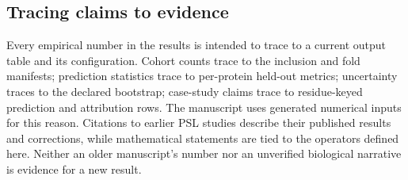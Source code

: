 \subsection{Tracing claims to evidence}
\label{sec:evidence_details}
Every empirical number in the results is intended to trace to a current output table and its configuration. Cohort counts trace to the inclusion and fold manifests; prediction statistics trace to per-protein held-out metrics; uncertainty traces to the declared bootstrap; case-study claims trace to residue-keyed prediction and attribution rows. The manuscript uses generated numerical inputs for this reason. Citations to earlier PSL studies describe their published results and corrections, while mathematical statements are tied to the operators defined here. Neither an older manuscript's number nor an unverified biological narrative is evidence for a new result.

